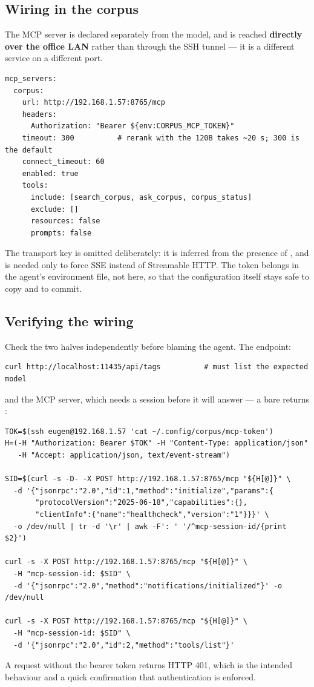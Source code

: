 \subsection{Wiring in the corpus}

The MCP server is declared separately from the model, and is reached
\textbf{directly over the office LAN} rather than through the SSH tunnel --- it
is a different service on a different port.

\begin{lstlisting}
mcp_servers:
  corpus:
    url: http://192.168.1.57:8765/mcp
    headers:
      Authorization: "Bearer ${env:CORPUS_MCP_TOKEN}"
    timeout: 300          # rerank with the 120B takes ~20 s; 300 is the default
    connect_timeout: 60
    enabled: true
    tools:
      include: [search_corpus, ask_corpus, corpus_status]
      exclude: []
      resources: false
      prompts: false
\end{lstlisting}

The transport key is omitted deliberately: it is inferred from the presence of
, and is needed only to force SSE instead of Streamable HTTP. The
token belongs in the agent's environment file, not here, so that the
configuration itself stays safe to copy and to commit.

\subsection{Verifying the wiring}

Check the two halves independently before blaming the agent. The endpoint:

\begin{lstlisting}
curl http://localhost:11435/api/tags          # must list the expected model
\end{lstlisting}

and the MCP server, which needs a session before it will answer --- a bare
 returns :

\begin{lstlisting}
TOK=$(ssh eugen@192.168.1.57 'cat ~/.config/corpus/mcp-token')
H=(-H "Authorization: Bearer $TOK" -H "Content-Type: application/json"
   -H "Accept: application/json, text/event-stream")

SID=$(curl -s -D- -X POST http://192.168.1.57:8765/mcp "${H[@]}" \
  -d '{"jsonrpc":"2.0","id":1,"method":"initialize","params":{
       "protocolVersion":"2025-06-18","capabilities":{},
       "clientInfo":{"name":"healthcheck","version":"1"}}}' \
  -o /dev/null | tr -d '\r' | awk -F': ' '/^mcp-session-id/{print $2}')

curl -s -X POST http://192.168.1.57:8765/mcp "${H[@]}" \
  -H "mcp-session-id: $SID" \
  -d '{"jsonrpc":"2.0","method":"notifications/initialized"}' -o /dev/null

curl -s -X POST http://192.168.1.57:8765/mcp "${H[@]}" \
  -H "mcp-session-id: $SID" \
  -d '{"jsonrpc":"2.0","id":2,"method":"tools/list"}'
\end{lstlisting}

A request without the bearer token returns HTTP 401, which is the intended
behaviour and a quick confirmation that authentication is enforced.
